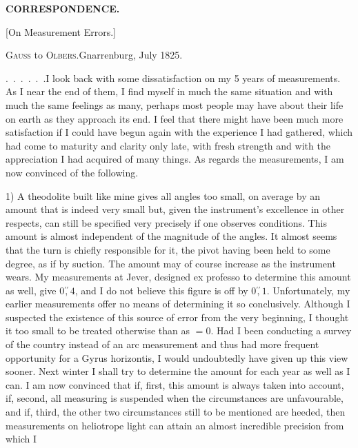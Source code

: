 \par\clearpage
\noindent{}\hfill{\small\textbf{CORRESPONDENCE.}}\hfill\null\par\bigskip
\begin{center}{\large [On Measurement Errors.]}\par\bigskip
{\large\textsc{Gauss} to \textsc{Olbers}.\quad Gnarrenburg, July 1825.}\end{center}
\par\noindent\hspace*{\parindent}.\ .\ .\ .\ .\ .\enspace I look back with some dissatisfaction on my 5 years of measurements. As I near the end of them, I find myself in much the same situation and with much the same feelings as many, perhaps most people may have about their life on earth as they approach its end. I feel that there might have been much more satisfaction if I could have begun again with the experience I had gathered, which had come to maturity and clarity only late, with fresh strength and with the appreciation I had acquired of many things. As regards the measurements, I am now convinced of the following.

\par\noindent\hspace*{\parindent}1) A theodolite built like mine gives all angles too small, on average by an amount that is indeed very small but, given the instrument's excellence in other respects, can still be specified very precisely if one observes  conditions. This amount is almost independent of the magnitude of the angles. It almost seems that the  turn is chiefly responsible for it, the pivot having been held to some degree, as if by suction. The amount may of course increase as the instrument wears. My measurements at Jever, designed ex professo to determine this amount as well, give $0\overset{\prime\prime}{,}4$, and I do not believe this figure is off by $0\overset{\prime\prime}{,}1$. Unfortunately, my earlier measurements offer no means of determining it so conclusively. Although I suspected the existence of this source of error from the very beginning, I thought it too small to be treated otherwise than as $=0$. Had I been conducting a survey of the country instead of an arc measurement and thus had more frequent opportunity for a Gyrus horizontis, I would undoubtedly have given up this view sooner. Next winter I shall try to determine the amount for each year as well as I can. I am now convinced that if, first, this amount is always taken into account, if, second, all measuring is suspended when the circumstances are unfavourable, and if, third, the other two circumstances still to be mentioned are heeded, then measurements on heliotrope light can attain an almost incredible precision from which I

